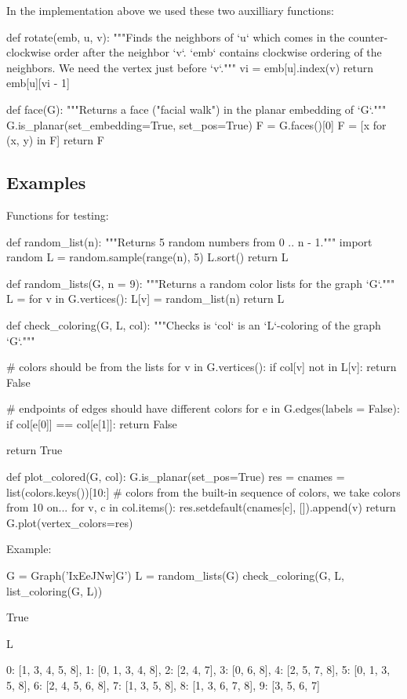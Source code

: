 In the implementation above we used these two auxilliary functions:
\begin{sageCell}
def rotate(emb, u, v):
    """Finds the neighbors of `u` which comes in the counter-clockwise order
    after the neighbor `v`.
    `emb` contains clockwise ordering of the neighbors. We need
    the vertex just before `v`."""
    vi = emb[u].index(v)
    return emb[u][vi - 1]

def face(G):
    """Returns a face ("facial walk") in the planar embedding of `G`."""
    G.is_planar(set_embedding=True, set_pos=True)
    F = G.faces()[0]
    F = [x for (x, y) in F]
    return F
\end{sageCell}


\subsection*{Examples}

Functions for testing:
\begin{sageCell}
def random_list(n):
    """Returns 5 random numbers from 0 .. n - 1."""
    import random
    L = random.sample(range(n), 5)
    L.sort()
    return L

def random_lists(G, n = 9):
    """Returns a random color lists for the graph `G`."""
    L = {}
    for v in G.vertices():
        L[v] = random_list(n)
    return L

    def check_coloring(G, L, col):
    """Checks is `col` is an `L`-coloring of the graph `G`."""

    # colors should be from the lists
    for v in G.vertices():
        if col[v] not in L[v]:
            return False

    # endpoints of edges should have different colors
    for e in G.edges(labels = False):
        if col[e[0]] == col[e[1]]:
            return False

    return True

def plot_colored(G, col):
    G.is_planar(set_pos=True)
    res = {}
    cnames = list(colors.keys())[10:]  # colors from the built-in sequence of colors, we take colors from 10 on...
    for v, c in col.items():
        res.setdefault(cnames[c], []).append(v)
    return G.plot(vertex_colors=res)
\end{sageCell}

Example:
\begin{sageCell}
    G = Graph('IxEeJNw]G')
    L = random_lists(G)
    check_coloring(G, L, list_coloring(G, L))
\end{sageCell}
\begin{outCell}
    True
\end{outCell}
\begin{sageCell}
    L
\end{sageCell}
\begin{outCell}
    {0: [1, 3, 4, 5, 8],
     1: [0, 1, 3, 4, 8],
     2: [2, 4, 7],
     3: [0, 6, 8],
     4: [2, 5, 7, 8],
     5: [0, 1, 3, 5, 8],
     6: [2, 4, 5, 6, 8],
     7: [1, 3, 5, 8],
     8: [1, 3, 6, 7, 8],
     9: [3, 5, 6, 7]}
\end{outCell}

